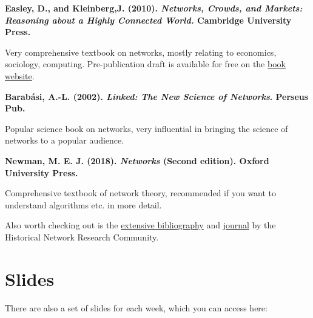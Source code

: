 \documentclass[
]{book}
\begin{document}
\textbf{Easley, D., and Kleinberg,J. (2010). \emph{Networks, Crowds, and Markets:
Reasoning about a Highly Connected World.} Cambridge University Press.}

Very comprehensive textbook on networks, mostly relating to economics,
sociology, computing. Pre-publication draft is available for free on the
\href{https://www.cs.cornell.edu/home/kleinber/networks-book/}{book website}.

\textbf{Barabási, A.-L. (2002). \emph{Linked: The New Science of Networks}. Perseus
Pub.}

Popular science book on networks, very influential in bringing the
science of networks to a popular audience.

\textbf{Newman, M. E. J. (2018). \emph{Networks} (Second edition). Oxford
University Press.}

Comprehensive textbook of network theory, recommended if you want to
understand algorithms etc. in more detail.

Also worth checking out is the \href{https://historicalnetworkresearch.org/bibliography/}{extensive
bibliography} and
\href{https://jhnr.uni.lu/index.php/jhnr}{journal} by the Historical Network
Research Community.

\hypertarget{slides}{%
\section{Slides}\label{slides}}

There are also a set of slides for each week, which you can access here:
\end{document}
